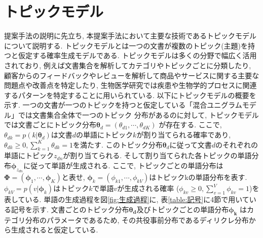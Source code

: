 \documentclass{ltjarticle}
\begin{document}
\section{トピックモデル}
提案手法の説明に先立ち, 本提案手法において主要な技術であるトピックモデルについて説明する. 
トピックモデルとは一つの文書が複数のトピック(主題)を持つと仮定する確率生成モデルである. 
トピックモデルは多くの分野で幅広く活用されており, 例えば文書集合を解析してカテゴリやトピックごとに分類したり, 
顧客からのフィードバックやレビューを解析して商品やサービスに関する主要な問題点や改善点を特定したり, 
生物医学研究では疾患や生物学的プロセスに関連するパターンを特定することに用いられている. 
以下にトピックモデルの概要を示す. 一つの文書が一つのトピックを持つと仮定している「混合ユニグラムモデル」では文書集合全体で一つのトピック
分布があるのに対して, トピックモデルでは文書ごとにトピック分布$\boldsymbol{\theta}_d=(\theta_{d1},\cdots,\theta_{dK})$
が存在する. ここで, $\theta_{dk} = p(k|\boldsymbol{\theta}_d)$は文書$d$の単語にトピック$k$が割り当てられる確率であり, 
$\theta_{dk}\geq0,\sum_{k=1}^K \theta_{dk}=1$を満たす. 
このトピック分布$\boldsymbol{\theta}_d$に従って文書$d$のそれぞれの単語にトピック$z_{dn}$が割り当てられる. 
そして割り当てられた各トピックの単語分布$\boldsymbol{\phi}_{z_{dn}}$に従って単語が生成される. 
ここで, トピックごとの単語分布は$\boldsymbol{\Phi}=(\boldsymbol{\phi}_1, \cdots, \boldsymbol{\phi}_K)$と表せ, 
$\boldsymbol{\phi}_k=(\phi_{k1}, \cdots, \phi_{kV})$はトピックkの単語分布を表す. 
$\phi_{kV}=p(v|\boldsymbol{\phi}_k)$はトピック$k$で単語$v$が生成される確率
($\phi_{kv}\geq0, \sum_{v=1}^V \phi_{kv}=1$)を表している.  
単語の生成過程を図\ref{fig:生成過程}に, 表\ref{table:記号}に4節で用いている記号を示す. 文書ごとのトピック分布$\boldsymbol{\theta_d}$及びトピックごとの単語分布$\boldsymbol{\phi_k}$
はカテゴリ分布のパラメータであるため, その共役事前分布であるディリクレ分布から生成されると仮定している. 
\end{document}
